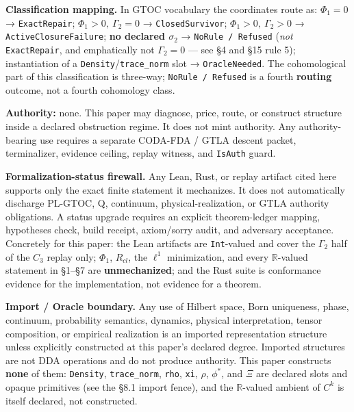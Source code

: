 \documentclass[
]{article}
\begin{document}
\textbf{Classification mapping.} In GTOC vocabulary the coordinates route as: \(\Phi_1=0\) → \texttt{ExactRepair}; \(\Phi_1>0,\ \Gamma_2=0\) → \texttt{ClosedSurvivor}; \(\Phi_1>0,\ \Gamma_2>0\) → \texttt{ActiveClosureFailure}; \textbf{no declared \(\sigma_2\)} → \texttt{NoRule\ /\ Refused} (\emph{not} \texttt{ExactRepair}, and emphatically not \(\Gamma_2=0\) --- see §4 and §15 rule 5); instantiation of a \texttt{Density}/\texttt{trace\_norm} slot → \texttt{OracleNeeded}. The cohomological part of this classification is three-way; \texttt{NoRule\ /\ Refused} is a fourth \textbf{routing} outcome, not a fourth cohomology class.

\textbf{Authority:} none. This paper may diagnose, price, route, or construct structure inside a declared obstruction regime. It does not mint authority. Any authority-bearing use requires a separate CODA-FDA / GTLA descent packet, terminalizer, evidence ceiling, replay witness, and \texttt{IsAuth} guard.

\textbf{Formalization-status firewall.} Any Lean, Rust, or replay artifact cited here supports only the exact finite statement it mechanizes. It does not automatically discharge PL-GTOC, Q, continuum, physical-realization, or GTLA authority obligations. A status upgrade requires an explicit theorem-ledger mapping, hypotheses check, build receipt, axiom/sorry audit, and adversary acceptance. Concretely for this paper: the Lean artifacts are \texttt{Int}-valued and cover the \(\Gamma_2\) half of the \(C_3\) replay only; \(\Phi_1\), \(R_{cl}\), the \(\ell^1\) minimization, and every \(\mathbb{R}\)-valued statement in §1--§7 are \textbf{unmechanized}; and the Rust suite is conformance evidence for the implementation, not evidence for a theorem.

\textbf{Import / Oracle boundary.} Any use of Hilbert space, Born uniqueness, phase, continuum, probability semantics, dynamics, physical interpretation, tensor composition, or empirical realization is an imported representation structure unless explicitly constructed at this paper's declared degree. Imported structures are not DDA operations and do not produce authority. This paper constructs \textbf{none} of them: \texttt{Density}, \texttt{trace\_norm}, \texttt{rho}, \texttt{xi}, \(\rho\), \(\phi^*\), and \(\Xi\) are declared slots and opaque primitives (see the §8.1 import fence), and the \(\mathbb{R}\)-valued ambient of \(C^k\) is itself declared, not constructed.
\end{document}
